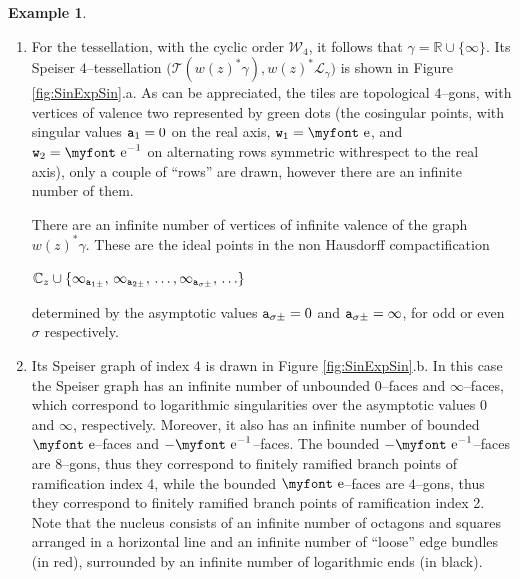 \documentclass[final,3p,times]{elsarticle}
\newcommand{\CC}{\ensuremath{{\mathbb C}}}
\newcommand{\RR}{\ensuremath{{\mathbb R}}}
\newcommand{\e}{{\text{\myfont e}}}
\theoremstyle{definition}
\newtheorem{example}{Example}[section]
\begin{document}
\begin{example}
\begin{enumerate}[label=\alph*),leftmargin=*]
\item
For the tessellation, with the cyclic order $\mathcal{W}_4$, it follows that 
$\gamma=\RR\cup\{\infty\}$.
Its Speiser $4$--tessellation 
$\big( \mathscr{T}(w(z)^* \gamma),w(z)^* \mathcal{L}_\gamma \big)$ is shown in 
Figure \ref{fig:SinExpSin}.a. 
As can be appreciated, the tiles are topological $4$--gons, 
with vertices of valence two represented by 
green dots (the cosingular points, with singular values ${\tt a}_1=0$ on the real axis, 
${\tt w}_1=\e$, and ${\tt w}_2=\e^{-1}$ on alternating rows symmetric withrespect to the
real axis),
only a couple of ``rows'' are drawn, however there are an infinite number of them. 

There are an infinite number of vertices of infinite valence of 
the graph $w(z)^*\gamma$.
These are the ideal points in the non Hausdorff compactification 

\centerline{$\CC_z \cup \{ 
\infty_{{\tt a}_{1\pm}}, \, 
\infty_{{\tt a}_{2\pm}}, \, 
\ldots, 
\infty_{{\tt a}_{\sigma\pm}},\,
\ldots
\}$}

\noindent 
determined by the asymptotic values ${\tt a}_{\sigma\pm}=0$ and 
${\tt a}_{\sigma\pm}=\infty$, for odd or even $\sigma$ respectively.

\item
Its Speiser graph of index $4$ is drawn in Figure \ref{fig:SinExpSin}.b.
In this case the Speiser graph has an infinite number of unbounded 0--faces 
and $\infty$--faces, which correspond to logarithmic singularities over the 
asymptotic values 0 and $\infty$, respectively. 
Moreover, it also has an infinite number of bounded $\e$--faces and $-\e^{-1}$--faces. 
The bounded $-\e^{-1}$--faces are $8$--gons, thus they correspond to 
finitely ramified branch points of ramification index 4, 
while the bounded $\e$--faces are $4$--gons, thus they correspond to 
finitely ramified branch points of ramification index 2.
Note that the nucleus consists of an infinite number of octagons and squares arranged in a horizontal line 
and an infinite number of ``loose'' edge bundles (in red), 
surrounded by an infinite number of logarithmic ends (in black).
\end{enumerate}
\end{example}
\end{document}
